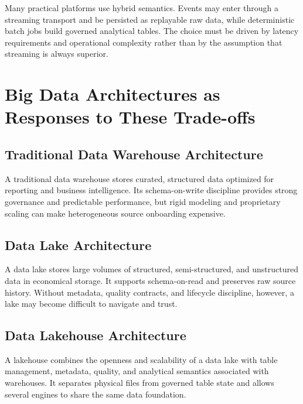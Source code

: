 Many practical platforms use hybrid semantics. Events may enter through a streaming transport and be persisted as replayable raw data, while deterministic batch jobs build governed analytical tables. The choice must be driven by latency requirements and operational complexity rather than by the assumption that streaming is always superior.

\section{Big Data Architectures as Responses to These Trade-offs}

\subsection{Traditional Data Warehouse Architecture}
A traditional data warehouse stores curated, structured data optimized for reporting and business intelligence. Its schema-on-write discipline provides strong governance and predictable performance, but rigid modeling and proprietary scaling can make heterogeneous source onboarding expensive.

\subsection{Data Lake Architecture}
A data lake stores large volumes of structured, semi-structured, and unstructured data in economical storage. It supports schema-on-read and preserves raw source history. Without metadata, quality contracts, and lifecycle discipline, however, a lake may become difficult to navigate and trust.

\subsection{Data Lakehouse Architecture}
A lakehouse combines the openness and scalability of a data lake with table management, metadata, quality, and analytical semantics associated with warehouses. It separates physical files from governed table state and allows several engines to share the same data foundation.

